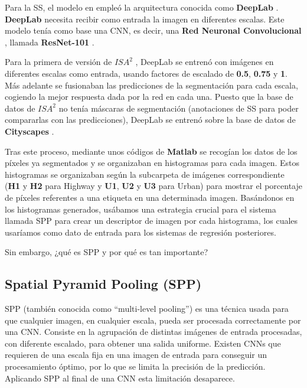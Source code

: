 Para la \ac{SS}, el modelo en \cite{isa2} empleó la arquitectura conocida como \textbf{DeepLab} \cite{deeplab}. \textbf{DeepLab} necesita recibir como entrada la imagen en diferentes escalas. Este modelo tenía como base una \ac{CNN}, es decir, una \textbf{Red Neuronal Convolucional} \cite{cnn}, llamada \textbf{ResNet-101} \cite{resnet}.

Para la primera de versión de $ISA^{2}$ \cite{isa2}, DeepLab se entrenó con imágenes en diferentes escalas como entrada, usando factores de escalado de \textbf{0.5}, \textbf{0.75} y \textbf{1}. Más adelante se fusionaban las predicciones de la segmentación para cada escala, cogiendo la mejor respuesta dada por la red en cada una. Puesto que la base de datos de $ISA^{2}$ no tenía máscaras de segmentación (anotaciones de \ac{SS} para poder compararlas con las predicciones), DeepLab se entrenó sobre la base de datos de \textbf{Cityscapes} \cite{cityscapes}.
 


Tras este proceso, mediante unos códigos de \textbf{Matlab} se recogían los datos de los píxeles ya segmentados y se organizaban en histogramas para cada imagen. Estos histogramas se organizaban según la subcarpeta de imágenes correspondiente (\textbf{H1} y \textbf{H2} para Highway y \textbf{U1}, \textbf{U2} y \textbf{U3} para Urban) para mostrar el porcentaje de píxeles referentes a una etiqueta en una determinada imagen. Basándonos en los histogramas generados, usábamos una estrategia crucial para el sistema llamada \ac{SPP} \cite{spp} para crear un descriptor de imagen por cada histograma, los cuales usaríamos como dato de entrada para los sistemas de regresión posteriores.

Sin embargo, ¿qué es \ac{SPP} y por qué es tan importante?

\subsection{Spatial Pyramid Pooling (SPP)}

\ac{SPP} (también conocida como ``multi-level pooling'') es una técnica usada para que cualquier imagen, en cualquier escala, pueda ser procesada correctamente por una \ac{CNN}. Consiste en la agrupación de distintas imágenes de entrada procesadas, con diferente escalado, para obtener una salida uniforme. Existen \ac{CNN}s que requieren de una escala fija en una imagen de entrada para conseguir un procesamiento óptimo, por lo que se limita la precisión de la predicción. Aplicando \ac{SPP} al final de una \ac{CNN} esta limitación desaparece.

